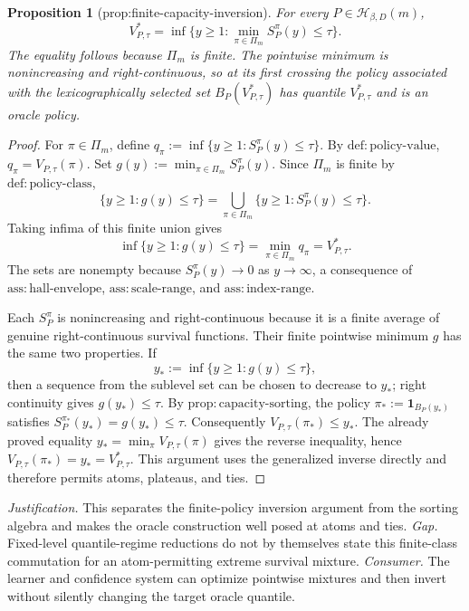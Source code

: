 \documentclass{article}
\newtheorem{proposition}{Proposition}
\begin{document}
\begin{proposition}[prop:finite-capacity-inversion]\label{prop:finite-capacity-inversion}
For every \(P\in\mathcal H_{\beta,D}(m)\), \[V^*_{P,\tau}=\inf\{y\ge1:\min_{\pi\in\Pi_m}S_P^{\pi}(y)\le\tau\}.\] The equality follows because \(\Pi_m\) is finite. The pointwise minimum is nonincreasing and right-continuous, so at its first crossing the policy associated with the lexicographically selected set \(B_P(V^*_{P,\tau})\) has quantile \(V^*_{P,\tau}\) and is an oracle policy.
\end{proposition}
\begin{proof}
For \(\pi\in\Pi_m\), define \(q_\pi:=\inf\{y\geq1:S_P^\pi(y)\leq\tau\}\).  By \(\mathrm{def{:}policy\text{-}value}\), \(q_\pi=V_{P,\tau}(\pi)\).  Set \(g(y):=\min_{\pi\in\Pi_m}S_P^\pi(y)\).  Since \(\Pi_m\) is finite by \(\mathrm{def{:}policy\text{-}class}\),
\[
\{y\geq1:g(y)\leq\tau\}
=\bigcup_{\pi\in\Pi_m}\{y\geq1:S_P^\pi(y)\leq\tau\}.
\]
Taking infima of this finite union gives
\[
\inf\{y\geq1:g(y)\leq\tau\}
=\min_{\pi\in\Pi_m}q_\pi
=V^*_{P,\tau}.
\]
The sets are nonempty because \(S_P^\pi(y)\to0\) as \(y\to\infty\), a consequence of \(\mathrm{ass{:}hall\text{-}envelope}\), \(\mathrm{ass{:}scale\text{-}range}\), and \(\mathrm{ass{:}index\text{-}range}\).

Each \(S_P^\pi\) is nonincreasing and right-continuous because it is a finite average of genuine right-continuous survival functions.  Their finite pointwise minimum \(g\) has the same two properties.  If
\[
y_*:=\inf\{y\geq1:g(y)\leq\tau\},
\]
then a sequence from the sublevel set can be chosen to decrease to \(y_*\); right continuity gives \(g(y_*)\leq\tau\).  By \(\mathrm{prop{:}capacity\text{-}sorting}\), the policy \(\pi_*:=\mathbf 1_{B_P(y_*)}\) satisfies \(S_P^{\pi_*}(y_*)=g(y_*)\leq\tau\).  Consequently \(V_{P,\tau}(\pi_*)\leq y_*\).  The already proved equality \(y_*=\min_\pi V_{P,\tau}(\pi)\) gives the reverse inequality, hence \(V_{P,\tau}(\pi_*)=y_*=V^*_{P,\tau}\).  This argument uses the generalized inverse directly and therefore permits atoms, plateaus, and ties.
\end{proof}
\par\smallskip\noindent \textit{Justification.} This separates the finite-policy inversion argument from the sorting algebra and makes the oracle construction well posed at atoms and ties. \textit{Gap.} Fixed-level quantile-regime reductions do not by themselves state this finite-class commutation for an atom-permitting extreme survival mixture. \textit{Consumer.} The learner and confidence system can optimize pointwise mixtures and then invert without silently changing the target oracle quantile.
\end{document}
